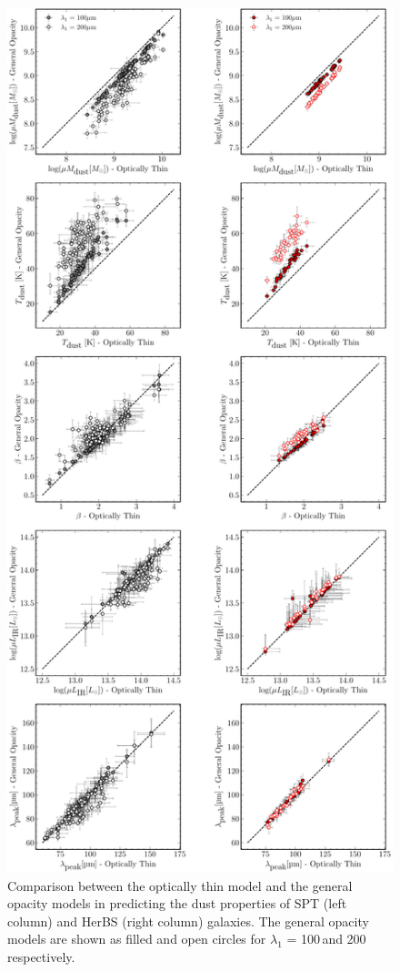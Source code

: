 \begin{figure}
	\centering
	\includegraphics[height=0.9\textheight]{Figures/optically_thin_against_general_opacity.pdf}
	\caption[Comparison of best fitting optically thin and general opacity parameters]{Comparison between the optically thin model and the general opacity models in predicting the dust properties of SPT (left column) and HerBS (right column) galaxies. The general opacity models are shown as filled and open circles for $\lambda_1$ = 100\,\micron and 200\,\micron respectively.}
	\label{fig:comparison_optically_thin_general_opacity}
\end{figure}

